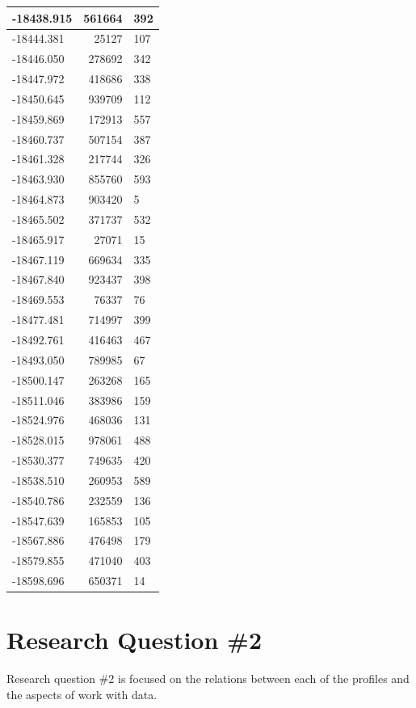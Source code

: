 \documentclass[]{book}
\theoremstyle{definition}
\theoremstyle{definition}
\theoremstyle{definition}
\theoremstyle{remark}
\begin{document}
\begin{tabular}{l|r|l}
\hline
-18438.915 & 561664 & 392\\
\hline
-18444.381 & 25127 & 107\\
\hline
-18446.050 & 278692 & 342\\
\hline
-18447.972 & 418686 & 338\\
\hline
-18450.645 & 939709 & 112\\
\hline
-18459.869 & 172913 & 557\\
\hline
-18460.737 & 507154 & 387\\
\hline
-18461.328 & 217744 & 326\\
\hline
-18463.930 & 855760 & 593\\
\hline
-18464.873 & 903420 & 5\\
\hline
-18465.502 & 371737 & 532\\
\hline
-18465.917 & 27071 & 15\\
\hline
-18467.119 & 669634 & 335\\
\hline
-18467.840 & 923437 & 398\\
\hline
-18469.553 & 76337 & 76\\
\hline
-18477.481 & 714997 & 399\\
\hline
-18492.761 & 416463 & 467\\
\hline
-18493.050 & 789985 & 67\\
\hline
-18500.147 & 263268 & 165\\
\hline
-18511.046 & 383986 & 159\\
\hline
-18524.976 & 468036 & 131\\
\hline
-18528.015 & 978061 & 488\\
\hline
-18530.377 & 749635 & 420\\
\hline
-18538.510 & 260953 & 589\\
\hline
-18540.786 & 232559 & 136\\
\hline
-18547.639 & 165853 & 105\\
\hline
-18567.886 & 476498 & 179\\
\hline
-18579.855 & 471040 & 403\\
\hline
-18598.696 & 650371 & 14\\
\hline
\end{tabular}

\section{Research Question \#2}\label{research-question-2}

Research question \#2 is focused on the relations between each of the
profiles and the aspects of work with data.
\end{document}
